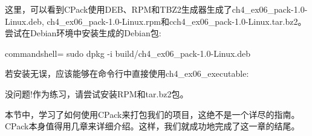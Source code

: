 这里，可以看到CPack使用DEB、RPM和TBZ2生成器生成了ch4\_ex06\_pack-1.0-Linux.deb, ch4\_ex06\_pack-1.0-Linux.rpm和cch4\_ex06\_pack-1.0-Linux.tar.bz2。尝试在Debian环境中安装生成的Debian包:

\begin{tcblisting}{commandshell={}}
sudo dpkg -i build/ch4_ex06_pack-1.0-Linux.deb
\end{tcblisting}

若安装无误，应该能够在命令行中直接使用ch4\_ex06\_executable:


没问题!作为练习，请尝试安装RPM和tar.bz2包。

本节中，学习了如何使用CPack来打包我们的项目，这绝不是一个详尽的指南。CPack本身值得用几章来详细介绍。这样，我们就成功地完成了这一章的结尾。








